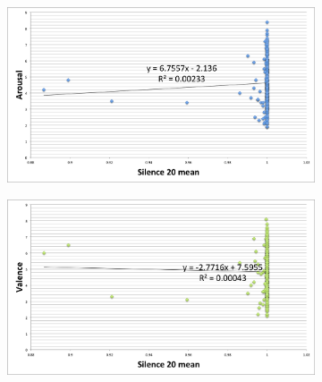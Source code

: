 \begin{figure}
         \centering
        \begin{subfigure}[b]{0.48\textwidth}
                \includegraphics[width=\textwidth]{Figures/silence20mean-arousal}
			   \vspace{20pt}
        \end{subfigure}
        \begin{subfigure}[b]{0.48\textwidth}
                \includegraphics[width=\textwidth]{Figures/silence20mean-valence}
                  \vspace{20pt}
        \end{subfigure}
        

\end{figure}
